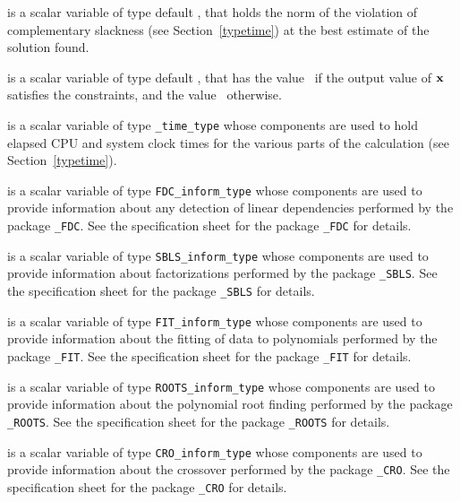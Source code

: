 \begin{description}
is a scalar variable of type default \realdp,
that holds the norm of the violation of complementary slackness
(see Section~\ref{typetime}) at the best estimate of the solution found.

 is a scalar variable of type default \logical, that has the
value \true\ if the output value of ${\mathbf{x}}$ satisfies the constraints,
and the value \false\ otherwise.

 is a scalar variable of type {\tt \packagename\_time\_type}
whose components are used to hold elapsed CPU and system clock times for the
various parts of the calculation (see Section~\ref{typetime}).

 is a scalar variable of type
{\tt FDC\_inform\_type}
whose components are used to provide information about
any detection of linear dependencies
performed by the package
{\tt \libraryname\_FDC}.
See the specification sheet for the package
{\tt \libraryname\_FDC} for details.

 is a scalar variable of type
{\tt SBLS\_inform\_type}
whose components are used to provide information about factorizations
performed by the package
{\tt \libraryname\_SBLS}.
See the specification sheet for the package
{\tt \libraryname\_SBLS} for details.

 is a scalar variable of type
{\tt FIT\_inform\_type}
whose components are used to provide information about the fitting
of data to polynomials performed by the package
{\tt \libraryname\_FIT}.
See the specification sheet for the package
{\tt \libraryname\_FIT} for details.

 is a scalar variable of type
{\tt ROOTS\_inform\_type}
whose components are used to provide information about the
polynomial root finding performed by the package
{\tt \libraryname\_ROOTS}.
See the specification sheet for the package
{\tt \libraryname\_ROOTS} for details.

 is a scalar variable of type
{\tt CRO\_inform\_type}
whose components are used to provide information about the crossover
performed by the package
{\tt \libraryname\_CRO}.
See the specification sheet for the package
{\tt \libraryname\_CRO} for details.

\end{description}
